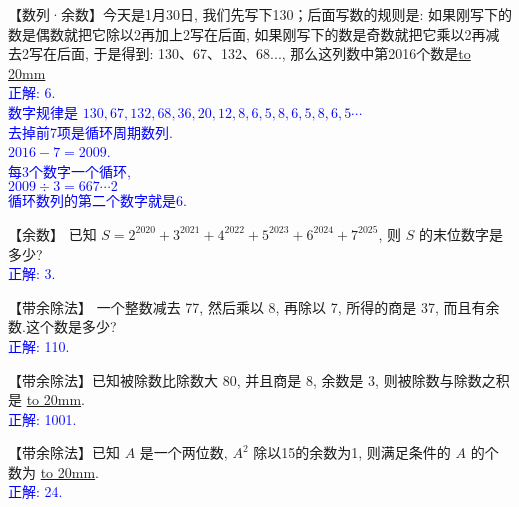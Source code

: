 \item {
    【数列·余数】今天是1月30日, 我们先写下130；后面写数的规则是: 如果刚写下的数是偶数就把它除以2再加上2写在后面, 如果刚写下的数是奇数就把它乘以2再减去2写在后面, 于是得到: 130、67、132、68..., 那么这列数中第2016个数是\underline{\hbox to 20mm{}}
    \ifshowSolution
        \\\fangsong{}\textcolor{blue}{
            正解: 6.\\
            数字规律是 $130,67,132,68,36,20,12,8,6,5,8,6,5,8,6,5\cdots$\\
            去掉前7项是循环周期数列.\\
            $2016-7=2009$.\\
            每3个数字一个循环,\\
            $ 2009\div 3 = 667\cdots 2$\\
            循环数列的第二个数字就是6.
        }
    \else
        \vspace{1cm}
    \fi
}

\item {
    【余数】
    已知 $S = 2^{2020} + 3^{2021} + 4^{2022} + 5^{2023} +6^{2024} + 7^{2025}$, 则 $S$ 的末位数字是多少? 
    \ifshowSolution
        \\\fangsong{}\textcolor{blue}{
            正解: 3.
        }
    \else
        \vspace{1cm}
    \fi
}

\item {
    【带余除法】
    一个整数减去 77, 然后乘以 8, 再除以 7, 所得的商是 37, 而且有余数.这个数是多少? 
    \ifshowSolution
        \\\fangsong{}\textcolor{blue}{
            正解: 110.
        }
    \else
        \vspace{1cm}
    \fi
}

\item {
    【带余除法】已知被除数比除数大 80, 并且商是 8, 余数是 3, 则被除数与除数之积是 \underline{\hbox to 20mm{}}.
    \ifshowSolution
        \\\fangsong{}\textcolor{blue}{
            正解: 1001.
        }
    \else
        \vspace{1cm}
    \fi
}

\item {
    【带余除法】已知 $A$ 是一个两位数, $A^2$ 除以15的余数为1, 则满足条件的 $A$ 的个数为 \underline{\hbox to 20mm{}}.
    \ifshowSolution
        \\\fangsong{}\textcolor{blue}{
            正解: 24.
        }
    \else
        \vspace{1cm}
    \fi
}

